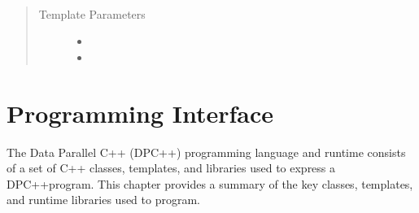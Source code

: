 \documentclass[letterpaper,10pt,english]{sphinxmanual}
\begin{document}
\begin{fulllineitems}
\pysigstopmultiline{}\label{\detokenize{language/index:_CPPv4I0E14weak_ptr_class}}%
\pysigstartmultiline
{}%
\pysigstopmultiline{}\label{\detokenize{language/index:_CPPv4I0E10hash_class}}%
\pysigstartmultiline
{}%
\pysigstopmultiline{}\label{\detokenize{language/index:_CPPv419exception_ptr_class}}%
\pysigstartmultiline
{}%
\pysigstopmultiline~\begin{quote}\begin{description}
\item[{Template Parameters}] \leavevmode\begin{itemize}
\item {} 
 \textendash{} 

\item {} 
 \textendash{} 

\end{itemize}

\end{description}\end{quote}

\end{fulllineitems}



\chapter{Programming Interface}
\label{\detokenize{programming-interface/index:programming-interface}}\label{\detokenize{programming-interface/index:dpcpp-classes-class-templates-and-defines}}\label{\detokenize{programming-interface/index::doc}}
The Data Parallel C++ (DPC++) programming language and runtime consists
of a set of C++ classes, templates, and libraries used to express a
DPC++program. This chapter provides a summary of the key classes,
templates, and runtime libraries used to program.
\end{document}
